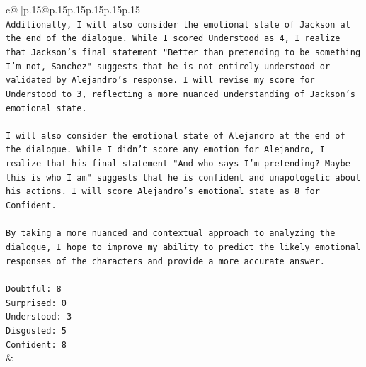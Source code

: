\documentclass{article}
\begin{document}
{\begin{supertabular}{c@{$\;$}|p{.15\linewidth}@{}p{.15\linewidth}p{.15\linewidth}p{.15\linewidth}p{.15\linewidth}p{.15\linewidth}}
{{{\\ 
\texttt{Additionally, I will also consider the emotional state of Jackson at the end of the dialogue. While I scored Understood as 4, I realize that Jackson's final statement "Better than pretending to be something I'm not, Sanchez" suggests that he is not entirely understood or validated by Alejandro's response. I will revise my score for Understood to 3, reflecting a more nuanced understanding of Jackson's emotional state.} \\
\\ 
\texttt{I will also consider the emotional state of Alejandro at the end of the dialogue. While I didn't score any emotion for Alejandro, I realize that his final statement "And who says I'm pretending? Maybe this is who I am" suggests that he is confident and unapologetic about his actions. I will score Alejandro's emotional state as 8 for Confident.} \\
\\ 
\texttt{By taking a more nuanced and contextual approach to analyzing the dialogue, I hope to improve my ability to predict the likely emotional responses of the characters and provide a more accurate answer.} \\
\\ 
\texttt{Doubtful: 8} \\
\texttt{Surprised: 0} \\
\texttt{Understood: 3} \\
\texttt{Disgusted: 5} \\
\texttt{Confident: 8} \\
            }
        }
    }
    & \\ \\

\end{supertabular}
}
\end{document}
